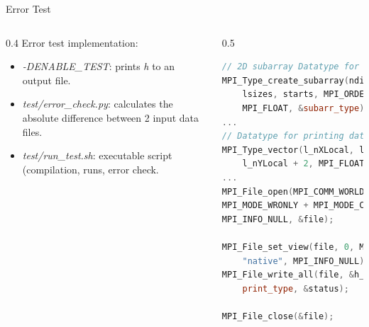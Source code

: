 \documentclass[
  english,            %
  aspectratio=169,    %
  11pt
]{tumbeamer}
\begin{document}
\begin{frame}[fragile]{Error Test}
	\begin{columns}
		\begin{column}{0.4\textwidth}
			\vfill
		Error test implementation:
		\begin{itemize}
			\item \textit{-DENABLE\_TEST}: prints \textit{h} to an output file.
			\item \textit{test/error\_check.py}: calculates the absolute difference between 2 input data files.
			\item \textit{test/run\_test.sh}: executable script (compilation, runs, error check. 
		\end{itemize}
		\end{column}
		\begin{column}{0.5\textwidth}
		\tiny
		\begin{lstlisting}[frame=single,language=C++,caption={Parallel IO for printing \textit{h}}, captionpos=b]
// 2D subarray Datatype for MPI_File_set_view
MPI_Type_create_subarray(ndims,  gsizes,\
	lsizes, starts, MPI_ORDER_C,\
	MPI_FLOAT, &subarr_type);
...
// Datatype for printing data
MPI_Type_vector(l_nXLocal, l_nYLocal, \
	l_nYLocal + 2, MPI_FLOAT, &print_type);
...
MPI_File_open(MPI_COMM_WORLD, filename.c_str(),\
MPI_MODE_WRONLY + MPI_MODE_CREATE,\
MPI_INFO_NULL, &file);

MPI_File_set_view(file, 0, MPI_FLOAT, subarr_type,\
	"native", MPI_INFO_NULL);
MPI_File_write_all(file, &h_test[1][1], 1,\
	print_type, &status);
		
MPI_File_close(&file);
\end{lstlisting}
		\end{column}
	\end{columns}

\end{frame}
\end{document}

